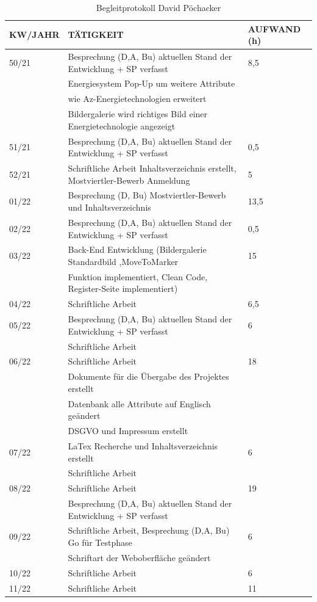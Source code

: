 \newpage
\begin{table}[h]
	\begin{tabular}{|l|l|l|}
		\hline
		\textbf{KW/JAHR} &     \textbf{TÄTIGKEIT}  & 	\textbf{AUFWAND (h)}    \\ \hline
		
50/21   & Besprechung (D,A, Bu) aktuellen Stand der Entwicklung + SP verfasst & 8,5 \\
		& Energiesystem Pop-Up um weitere Attribute  &  \\ 
		& wie Az-Energietechnologien erweitert & \\ 
		& Bildergalerie wird richtiges Bild einer Energietechnologie angezeigt& \\ \hline	
51/21   & Besprechung (D,A, Bu) aktuellen Stand der Entwicklung + SP verfasst & 0,5 \\ \hline			
52/21   & Schriftliche Arbeit Inhaltsverzeichnis erstellt, Mostviertler-Bewerb Anmeldung& 5 \\ \hline			
01/22   & Besprechung (D, Bu) Mostviertler-Bewerb und Inhaltsverzeichnis & 13,5 \\ \hline		
02/22   & Besprechung (D,A, Bu) aktuellen Stand der Entwicklung + SP verfasst & 0,5 \\ \hline	
03/22   & Back-End Entwicklung (Bildergalerie Standardbild ,MoveToMarker  & 15 \\ 
 		& Funktion implementiert, Clean Code, Register-Seite implementiert) & \\ \hline	
04/22   & Schriftliche Arbeit & 6,5 \\ \hline		
05/22   & Besprechung (D,A, Bu) aktuellen Stand der Entwicklung + SP verfasst  & 6 \\ 
		& Schriftliche Arbeit & \\ \hline		
06/22   & Schriftliche Arbeit & 18 \\
		& Dokumente für die Übergabe des Projektes erstellt &  \\ 
		& Datenbank alle Attribute auf Englisch geändert  & \\ 
		& DSGVO und Impressum erstellt  & \\ \hline	
07/22   & LaTex Recherche und Inhaltsverzeichnis erstellt  & 6 \\ 
		& Schriftliche Arbeit & \\ \hline	
08/22   & Schriftliche Arbeit  & 19 \\ 
		& Besprechung (D,A, Bu) aktuellen Stand der Entwicklung + SP verfasst  & \\ \hline
09/22   & Schriftliche Arbeit, Besprechung (D,A, Bu) Go für Testphase   & 6 \\ 
		& Schriftart der Weboberfläche geändert & \\ \hline		
10/22   & Schriftliche Arbeit & 6 \\ \hline
11/22   & Schriftliche Arbeit & 11 \\ \hline
		

	\end{tabular}
	\caption{Begleitprotokoll David Pöchacker}
	\label{tab:Begleitprotokoll David Pöchacker}
\end{table}
